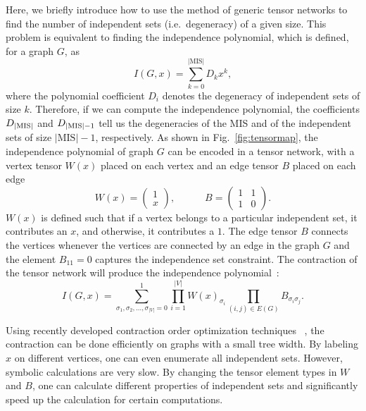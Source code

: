 \documentclass[twocolumn,amssymb,secnumarabic, prl, aps, nofootinbib]{revtex4-1}
\newcommand{\DMIS}{D_{|\textnormal{MIS}|}}
\newcommand{\DMISminusone}{D_{|\textnormal{MIS}|-1}}
\begin{document}
Here, we briefly introduce how to use the method of generic tensor networks to find the number of independent sets (i.e.\ degeneracy) of a given size.
This problem is equivalent to finding the independence polynomial, which is defined, for a graph $G$, as 
\begin{equation}
	I(G, x) = \sum_{k=0}^{|\text{MIS}|} D_k x^k,
\end{equation}
where the polynomial coefficient $D_i$ denotes the degeneracy of independent sets of size $k$. Therefore, if we can compute the independence polynomial, the coefficients $\DMIS$ and $\DMISminusone$ tell us the degeneracies of the MIS and of the independent sets of size $|\text{MIS}|-1$, respectively. As shown in Fig.~\ref{fig:tensormap}, the independence polynomial of graph $G$ can be encoded in a tensor network, with a vertex tensor $W(x)$ placed on each vertex and an edge tensor $B$ placed on each edge%
\begin{equation}
	W(x) = \left(\begin{matrix}
		1 \\
		x
	\end{matrix}\right),
	\qquad \quad 
	B = \left(\begin{matrix}
		1  & 1\\
		1 & 0
	\end{matrix}\right). \label{eq:tensor}
\end{equation}
$W(x)$ is defined such that if a vertex belongs to a particular independent set, it contributes an $x$, and otherwise, it contributes a $1$. The edge tensor $B$ connects the vertices whenever the vertices are connected by an edge in the graph $G$ and the element $B_{11} = 0$ captures the independence set constraint. The contraction of the tensor network will produce the independence polynomial~\cite{liu_tensor_2021}:  
\begin{equation}
	I(G, x) = \sum\limits_{\sigma_1, \sigma_2, \ldots, \sigma_{|V|} = 0}^{1} \prod\limits_{i=1}^{|V|} W(x)_{\sigma_i} \prod\limits_{(i,j) \in E(G)} B_{\sigma_i \sigma_j}.
\end{equation}

Using recently developed
contraction order optimization techniques
~\cite{Markov2008, pan_simulating_2021, kalachev_recursive_2021}, the contraction can be done efficiently on graphs with a small tree width. By labeling $x$ on different vertices, one can even enumerate all independent sets.
However, symbolic calculations are very slow. By changing the tensor element types in $W$ and $B$, one can calculate different properties of independent sets and significantly speed up the calculation for certain computations. 
\end{document}
